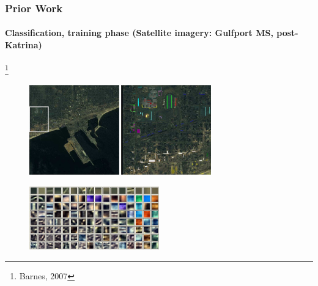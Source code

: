 \begin{frame}
\frametitle{Prior Work}
\framesubtitle{\small Classification, training phase (Satellite imagery: Gulfport MS, post-Katrina)}
\mypagenum\footnote{Barnes, 2007}
	\begin{figure}		
		\includegraphics[width=0.7\textwidth]{figs/RVQ_SatelliteKatrina_1_snippets.png}			
	\end{figure}
	\begin{figure}		
		\includegraphics[width=0.5\textwidth]{figs/RVQ_SatelliteKatrina_2_codebooks.png}			
	\end{figure}
\end{frame}





